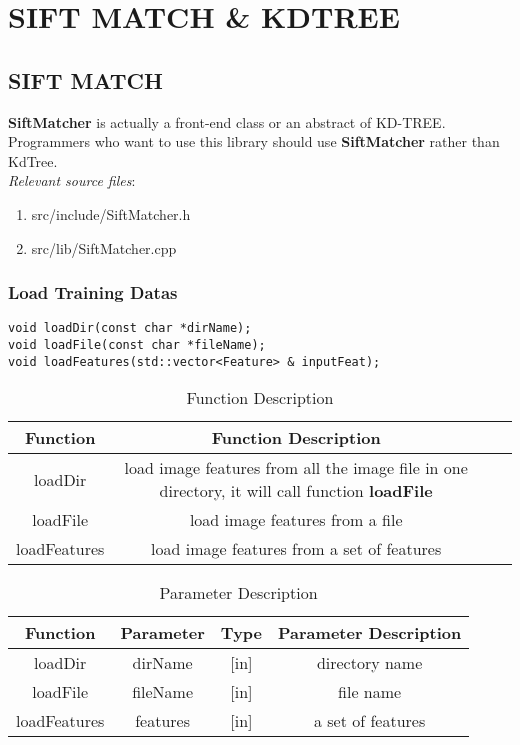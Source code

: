 \documentclass[paper=a4, fontsize=11pt]{scrartcl} %
\numberwithin{equation}{section} %
\numberwithin{figure}{section} %
\numberwithin{table}{section} %
\begin{document}
\section{SIFT MATCH \& KDTREE} \label{sift-match}

\subsection{SIFT MATCH}

\textbf{SiftMatcher} is actually a front-end class or an abstract of KD-TREE. Programmers who want to use this library should use \textbf{SiftMatcher} rather than {KdTree}.  \\

\textsl{Relevant source files}: 

\begin{enumerate}
    \item src/include/SiftMatcher.h
    \item src/lib/SiftMatcher.cpp
\end{enumerate}


\subsubsection{Load Training Datas}

\begin{lstlisting}
void loadDir(const char *dirName);
void loadFile(const char *fileName);
void loadFeatures(std::vector<Feature> & inputFeat);
\end{lstlisting}


\begin{table}[h]
    \centering
    \begin{tabular}{|c|c| lp{}}
        \hline
        \textbf{Function} & \textbf{Function Description} \\\hline
                  loadDir & load image features from all the image file in one directory, it will call function \textbf{loadFile} \\\hline
loadFile & load image features from a file \\\hline
loadFeatures & load image features from a set of features \\\hline
    \end{tabular}
    \caption{Function Description}\label{nolock}
\end{table}

\begin{table}[h]
    \centering
    \begin{tabular}{|c|c|c|c|}
        \hline
        \textbf{Function} & \textbf{Parameter} & \textbf{Type} & \textbf{Parameter Description} \\\hline
        loadDir & dirName & [in] & directory name \\\hline
        loadFile& fileName & [in] & file name \\\hline
        loadFeatures & features & [in] & a set of features \\\hline
    \end{tabular}
    \caption{Parameter Description}\label{nolock}
\end{table}
\end{document}
